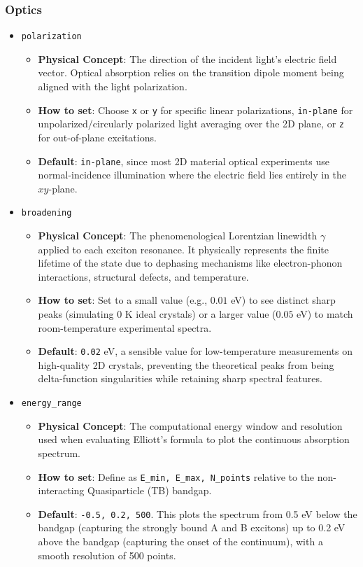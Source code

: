 \documentclass[11pt, a4paper]{article}
\begin{document}
\subsubsection{Optics}
\begin{itemize}
    \item \texttt{polarization}
    \begin{itemize}
        \item \textbf{Physical Concept}: The direction of the incident light's electric field vector. Optical absorption relies on the transition dipole moment being aligned with the light polarization.
        \item \textbf{How to set}: Choose \texttt{x} or \texttt{y} for specific linear polarizations, \texttt{in-plane} for unpolarized/circularly polarized light averaging over the 2D plane, or \texttt{z} for out-of-plane excitations.
        \item \textbf{Default}: \texttt{in-plane}, since most 2D material optical experiments use normal-incidence illumination where the electric field lies entirely in the $xy$-plane.
    \end{itemize}
    \item \texttt{broadening}
    \begin{itemize}
        \item \textbf{Physical Concept}: The phenomenological Lorentzian linewidth $\gamma$ applied to each exciton resonance. It physically represents the finite lifetime of the state due to dephasing mechanisms like electron-phonon interactions, structural defects, and temperature.
        \item \textbf{How to set}: Set to a small value (e.g., $0.01$ eV) to see distinct sharp peaks (simulating $0$ K ideal crystals) or a larger value ($0.05$ eV) to match room-temperature experimental spectra.
        \item \textbf{Default}: \texttt{0.02} eV, a sensible value for low-temperature measurements on high-quality 2D crystals, preventing the theoretical peaks from being delta-function singularities while retaining sharp spectral features.
    \end{itemize}
    \item \texttt{energy\_range}
    \begin{itemize}
        \item \textbf{Physical Concept}: The computational energy window and resolution used when evaluating Elliott's formula to plot the continuous absorption spectrum.
        \item \textbf{How to set}: Define as \texttt{E\_min, E\_max, N\_points} relative to the non-interacting Quasiparticle (TB) bandgap.
        \item \textbf{Default}: \texttt{-0.5, 0.2, 500}. This plots the spectrum from 0.5 eV below the bandgap (capturing the strongly bound A and B excitons) up to 0.2 eV above the bandgap (capturing the onset of the continuum), with a smooth resolution of 500 points.
    \end{itemize}
\end{itemize}
\end{document}
